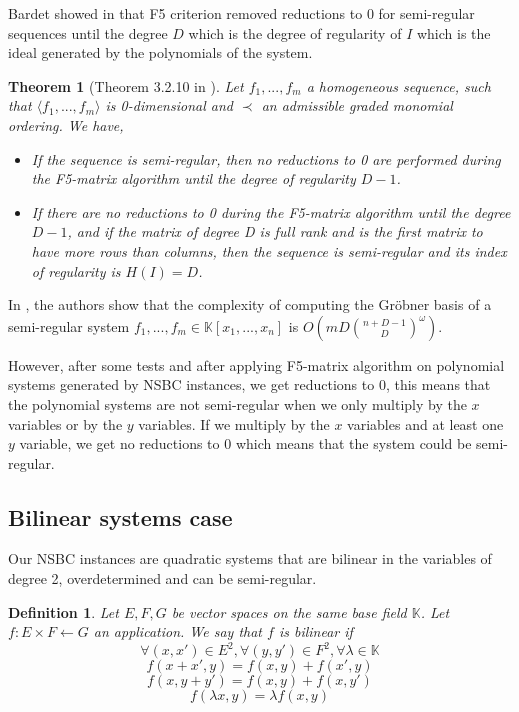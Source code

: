 \documentclass[english]{article}
\newtheorem{definition}{Definition}[section]
\newtheorem{theorem}{Theorem}[section]
\begin{document}
		Bardet showed in \cite{Bardet04} that F5 criterion removed reductions to 0 for semi-regular sequences until the degree $D$ which is the degree of regularity of $I$ which is the ideal generated by the polynomials of the system.
		
		\begin{theorem}[Theorem 3.2.10 in \cite{Bardet04}]
			Let $f_1,...,f_m$ a homogeneous sequence, such that $\langle f_1,...,f_m \rangle$ is 0-dimensional and
			$\prec$ an admissible graded monomial ordering. We have,
			\begin{itemize}
				\item[-] If the sequence is semi-regular, then no reductions to 0 are performed during the F5-matrix algorithm until the degree of regularity $D - 1$.
				\item[-] If there are no reductions to 0 during the F5-matrix algorithm until the degree $D - 1$, and if the matrix of degree D is full rank and is the first matrix to have more rows than columns, then the sequence is semi-regular and its index of regularity is $H(I) = D$.
			\end{itemize}
		\end{theorem}
		
		In \cite{BFS15}, the authors show that the complexity of computing the Gröbner basis of a semi-regular system $f_1,...,f_m \in \mathbb{K}[x_1,...,x_n]$ is $O\left(mD\binom{n+D-1}{D}^\omega \right)$.
		
		However, after some tests and after applying F5-matrix algorithm on polynomial systems generated by NSBC instances, we get reductions to 0, this means that the polynomial systems are not semi-regular when we only multiply by the $x$ variables or by the $y$ variables. If we multiply by the $x$ variables and at least one $y$ variable, we get no reductions to 0 which means that the system could be semi-regular.
		
		\subsection{Bilinear systems case}
		Our NSBC instances are quadratic systems that are bilinear in the variables of degree 2, overdetermined and can be semi-regular.
		
		\begin{definition}
			Let $E, F, G$ be vector spaces on the same base field $\mathbb{K}$. 
			Let $f: E \times F \leftarrow G$ an application. We say that $f$ is bilinear if
			$$
				\forall (x, x') \in E^2 , \forall (y, y') \in F^2 , \forall \lambda \in \mathbb{K}
			$$
			$$
				f(x + x',y) = f(x, y) + f(x', y)
			$$
			$$
				f(x, y + y') = f(x, y) + f(x, y')
			$$
			$$
				f(\lambda x, y) = \lambda f(x, y)
			$$
		\end{definition}
		
\end{document}
